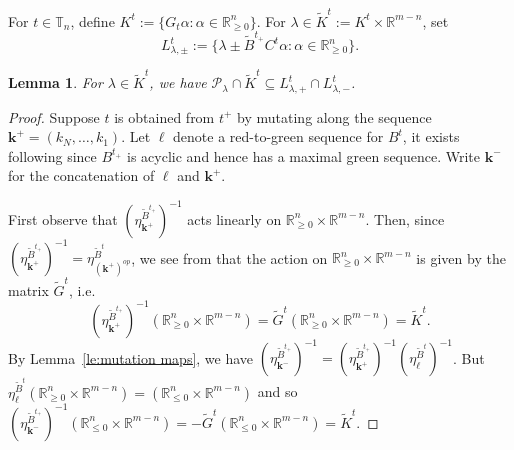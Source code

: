 \documentclass{amsart}
\newtheorem{lemma}[theorem]{Lemma}
\numberwithin{theorem}{section}
\newcommand{\bfk}{{\boldsymbol{k}}}
\newcommand{\bfl}{{\boldsymbol{\ell}}}
\newcommand{\cP}{\mathcal{P}}
\newcommand{\RR}{\mathbb{R}}
\newcommand{\TT}{\mathbb{T}}
\begin{document}
  For $t\in\TT_n$, define $K^t:=\{G_t\alpha:\alpha\in\RR_{\ge0}^n\}$.
  For $\lambda \in \widetilde K^t := K^t \times \RR^{m-n}$, set 
  \[L^t_{\lambda,\pm}:=\{\lambda \pm \widetilde B^{t_+} C^t\alpha:\alpha\in\RR_{\ge0}^n\}.\]
  \begin{lemma}
    For $\lambda\in \widetilde K^t$, we have $\cP_\lambda\cap \widetilde K^t\subseteq L^t_{\lambda,+}\cap L^t_{\lambda,-}$.
  \end{lemma}
  \begin{proof}
    Suppose $t$ is obtained from $t^+$ by mutating along the sequence $\bfk^+=(k_N,\ldots,k_1)$.
    Let $\bfl$ denote a red-to-green sequence for $B^t$, it exists following \cite[Corollary 3.2.2]{muller} since $B^{t_+}$ is acyclic and hence has a maximal green sequence.
    Write  $\bfk^-$ for the concatenation of $\bfl$ and $\bfk^+$.

    First observe that $\left(\eta^{\widetilde B^{t_+}}_{\bfk^+}\right)^{-1}$ acts linearly on $\RR_{\ge0}^n\times \RR^{m-n}$.
    Then, since $\left(\eta^{\widetilde B^{t_+}}_{\bfk^+}\right)^{-1}=\eta^{\widetilde B^t}_{(\bfk^+)^{op}}$, we see from \cite[Equation (1.13)]{nakanishi-zelevinsky} that the action on $\RR_{\ge0}^n\times \RR^{m-n}$ is given by the matrix $\widetilde G^t$, i.e. 
    \[\left(\eta^{\widetilde B^{t_+}}_{\bfk^+}\right)^{-1}(\RR_{\ge0}^n\times \RR^{m-n})=\widetilde G^t(\RR_{\ge0}^n\times \RR^{m-n})=\widetilde K^t.\]
    By Lemma~\ref{le:mutation maps}, we have $\left(\eta^{\widetilde B^{t_+}}_{\bfk^-}\right)^{-1}=\left(\eta^{\widetilde B^{t_+}}_{\bfk^+}\right)^{-1}\left(\eta^{\widetilde B^t}_\bfl\right)^{-1}$.
    But $\eta^{\widetilde B^t}_\bfl(\RR_{\ge0}^n\times \RR^{m-n})=(\RR_{\le0}^n\times \RR^{m-n})$ and so $\left(\eta^{\widetilde B^{t_+}}_{\bfk^-}\right)^{-1}(\RR_{\le0}^n\times \RR^{m-n})=-\widetilde G^t(\RR_{\le0}^n\times \RR^{m-n})=\widetilde K^t$.


\end{proof}
\end{document}
